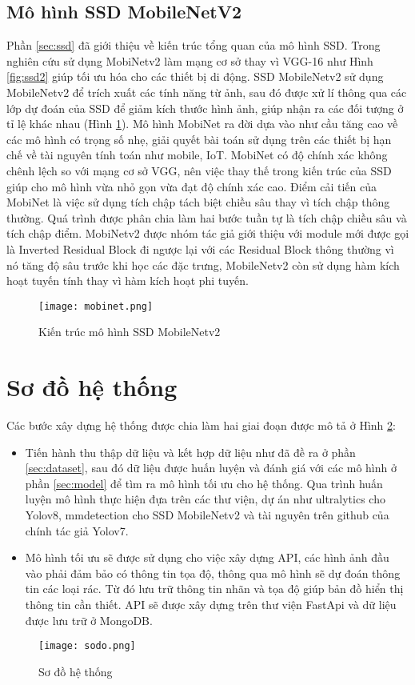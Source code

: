 \documentclass[../the.tex]{subfiles}
\begin{document}
\subsection{Mô hình SSD MobileNetV2}
{\fontsize{13}{12} \selectfont 
Phần \ref{sec:ssd} đã giới thiệu về kiến trúc tổng quan của mô hình SSD. Trong nghiên cứu sử dụng MobiNetv2 \cite{sandler2019mobilenetv2} làm mạng cơ sở thay vì VGG-16 như Hình \ref{fig:ssd2} giúp tối ưu hóa cho các thiết bị di động. SSD MobileNetv2 sử dụng MobileNetv2 để trích xuất các tính năng từ ảnh, sau đó được xử lí thông qua các lớp dự đoán của SSD để giảm kích thước hình ảnh, giúp nhận ra các đối tượng ở tỉ lệ khác nhau (Hình \ref{fig:mobinet}).
Mô hình MobiNet ra đời dựa vào như cầu tăng cao về các mô hình có trọng số nhẹ, giải quyết bài toán sử dụng trên các thiết bị hạn chế về tài nguyên tính toán như mobile, IoT. MobiNet có độ chính xác không chênh lệch so với mạng cơ sở VGG, nên việc thay thế trong kiến trúc của SSD giúp cho mô hình vừa nhỏ gọn vừa đạt độ chính xác cao.
Điểm cải tiến của MobiNet là việc sử dụng tích chập tách biệt chiều sâu thay vì tích chập thông thường. Quá trình được phân chia làm hai bước tuần tự là tích chập chiều sâu và tích chập điểm.
MobiNetv2 được nhóm tác giả giới thiệu với module mới được gọi là Inverted Residual Block đi ngược lại với các Residual Block thông thường vì nó tăng độ sâu trước khi học các đặc trưng, MobileNetv2 còn sử dụng hàm kích hoạt tuyến tính thay vì hàm kích hoạt phi tuyến.


}

\begin{figure}[H]
	\centering
	\texttt{[image: mobinet.png]}
	\caption{Kiến trúc mô hình SSD MobileNetv2}
	\label{fig:mobinet}
\end{figure}

\section{Sơ đồ hệ thống}

{\fontsize{13}{12} \selectfont 
Các bước xây dựng hệ thống được chia làm hai giai đoạn được mô tả ở Hình \ref{fig:sodo}:
\begin{itemize}
	\item Tiến hành thu thập dữ liệu và kết hợp dữ liệu như đã đề ra ở phần \ref{sec:dataset}, sau đó dữ liệu được huấn luyện và đánh giá với các mô hình ở phần \ref{sec:model} để tìm ra mô hình tối ưu cho hệ thống.
	Qua trình huấn luyện mô hình thực hiện đựa trên các thư viện, dự án như ultralytics cho Yolov8, mmdetection cho SSD MobileNetv2 và tài nguyên trên github của chính tác giả Yolov7.
	\item Mô hình tối ưu sẽ được sử dụng cho việc xây dựng API, các hình ảnh đầu vào phải đảm bảo có thông tin tọa độ, thông qua mô hình sẽ dự đoán thông tin các loại rác. Từ đó lưu trữ thông tin nhãn và tọa độ giúp bản đồ hiển thị thông tin cần thiết. 
	API sẽ được xây dựng trên thư viện FastApi và dữ liệu được lưu trữ ở MongoDB.
\end{itemize}
}
\bigskip

\begin{figure}[H]
	\centering
	\texttt{[image: sodo.png]}
	\caption{Sơ đồ hệ thống}
	\label{fig:sodo}
\end{figure}
\end{document}
